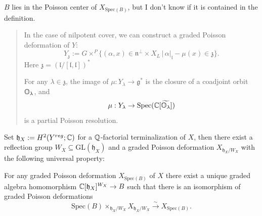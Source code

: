 \documentclass[12pt]{amsart}
\numberwithin{equation}{section}
\newcommand{\fg}{\mathfrak{g}} \newcommand{\fh}{\mathfrak{h}} \newcommand{\fk}{\mathfrak{k}}
\newcommand{\fl}{\mathfrak{l}} \newcommand{\fm}{\mathfrak{m}} \newcommand{\fn}{\mathfrak{n}}
\newcommand{\fz}{\mathfrak{z}}
\newcommand{\GL}{{\mathrm{GL}}} \newcommand{\SL}{{\mathrm{SL}}} \newcommand{\SU}{{\mathrm{SU}}}
\newcommand{\Spec}{\mathrm{Spec}}
\renewcommand{\tilde}{\widetilde}
\newcommand{\set}[2]{\{#1\,|\,#2\}}
\newcommand{\aiblock}[1]{
  \begin{quote} 
  {\color{CadetBlue}\sffamily\small #1}
  \end{quote}
}
\begin{document}
\begin{rk}
  $B$ lies in the Poisson center of $X_{\Spec(B)}$, but I don't know if it is contained in the definition.
\end{rk}

\aiblock{

In the case of nilpotent cover, we can construct a graded Poisson deformation of $Y$:
\[
  Y_{\fz} := G \times^P \set{(\alpha,x) \in \fn^{\perp} \times X_L }{ \alpha|_{\fl} - \mu(x) \in \fz }.
\]
Here $\fz = (\fl/[\fl,\fl])^*$

\begin{prop}
  For any $\lambda \in \fz$, the image of $\mu: Y_{\lambda} \to \fg^*$ is the closure of a coadjoint orbit ${\mathbb {O}}_{\lambda}$, and 
  \[
    \mu: Y_{\lambda} \to \Spec(\BC[\tilde{\BO_{\lambda}}])
  \] 
  is a partial Poisson resolution.
\end{prop}

}

\begin{thm}
  Set $\fh_X := H^2(Y^{reg};\BC)$ for a ${\mathbb {Q}}$-factorial terminalization of $X$, then there exist a reflection group $W_X  \subseteq \GL(\fh_X)$ and a graded Poisson deformation $X_{\fh_X / W_X}$ with the following universal property:
  
  For any graded Poisson deformation $X_{\Spec(B)}$ of $X$ there exist a unique graded algebra homomorphism $\BC[\fh_X]^{W_X} \to B$ such that there is an isomorphism of graded Poisson deformations
  \[
    \Spec(B) \times_{\fh_X / W_X} X_{\fh_X / W_X} \xrightarrow{\sim} X_{\Spec(B)}.
  \] 
\end{thm}

\begin{center}
\end{center}
\end{document}

